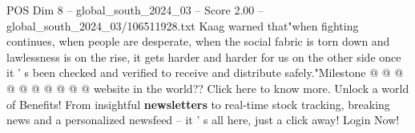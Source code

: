\begin{textsample}{POS Dim 8 – global\_south\_2024\_03 – Score 2.00 – global\_south\_2024\_03/106511928.txt}
Kaag warned that"when fighting continues, when people are desperate, when the social fabric is torn down and lawlessness is on the rise, it gets harder and harder for us on the other side once it ' s been checked and verified to receive and distribute safely."Milestone @ @ @ @ @ @ @ @ @ @ website in the world??
Click here to know more.
Unlock a world of Benefits!
From insightful \textbf{newsletters} to real-time stock tracking, breaking news and a personalized newsfeed -- it ' s all here, just a click away!
Login Now!

\end{textsample}
